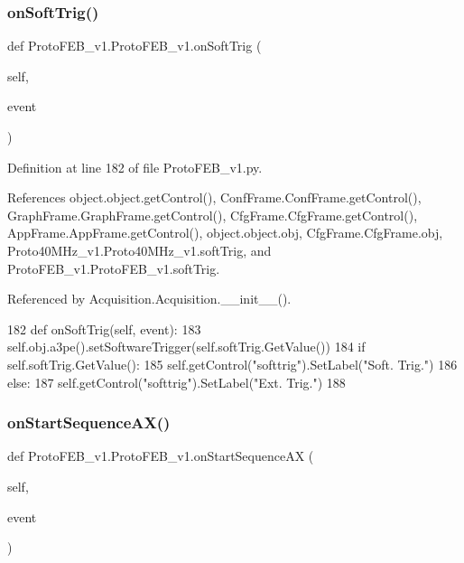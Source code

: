 \subsubsection{\texorpdfstring{on\+Soft\+Trig()}{onSoftTrig()}}
{\footnotesize\ttfamily def Proto\+F\+E\+B\+\_\+v1.\+Proto\+F\+E\+B\+\_\+v1.\+on\+Soft\+Trig (\begin{DoxyParamCaption}\item[{}]{self,  }\item[{}]{event }\end{DoxyParamCaption})}



Definition at line 182 of file Proto\+F\+E\+B\+\_\+v1.\+py.



References object.\+object.\+get\+Control(), Conf\+Frame.\+Conf\+Frame.\+get\+Control(), Graph\+Frame.\+Graph\+Frame.\+get\+Control(), Cfg\+Frame.\+Cfg\+Frame.\+get\+Control(), App\+Frame.\+App\+Frame.\+get\+Control(), object.\+object.\+obj, Cfg\+Frame.\+Cfg\+Frame.\+obj, Proto40\+M\+Hz\+\_\+v1.\+Proto40\+M\+Hz\+\_\+v1.\+soft\+Trig, and Proto\+F\+E\+B\+\_\+v1.\+Proto\+F\+E\+B\+\_\+v1.\+soft\+Trig.



Referenced by Acquisition.\+Acquisition.\+\_\+\+\_\+init\+\_\+\+\_\+().


\begin{DoxyCode}
182     \textcolor{keyword}{def }onSoftTrig(self, event):
183         self.obj.a3pe().setSoftwareTrigger(self.softTrig.GetValue())
184         \textcolor{keywordflow}{if} self.softTrig.GetValue():
185             self.getControl(\textcolor{stringliteral}{"softtrig"}).SetLabel(\textcolor{stringliteral}{"Soft. Trig."})
186         \textcolor{keywordflow}{else}:
187             self.getControl(\textcolor{stringliteral}{"softtrig"}).SetLabel(\textcolor{stringliteral}{"Ext. Trig."})
188 
\end{DoxyCode}
\mbox{\label{classProtoFEB__v1_1_1ProtoFEB__v1_a5ab10f7dde24277b9c9680aaf4cd804b}} 
\subsubsection{\texorpdfstring{on\+Start\+Sequence\+A\+X()}{onStartSequenceAX()}}
{\footnotesize\ttfamily def Proto\+F\+E\+B\+\_\+v1.\+Proto\+F\+E\+B\+\_\+v1.\+on\+Start\+Sequence\+AX (\begin{DoxyParamCaption}\item[{}]{self,  }\item[{}]{event }\end{DoxyParamCaption})}



